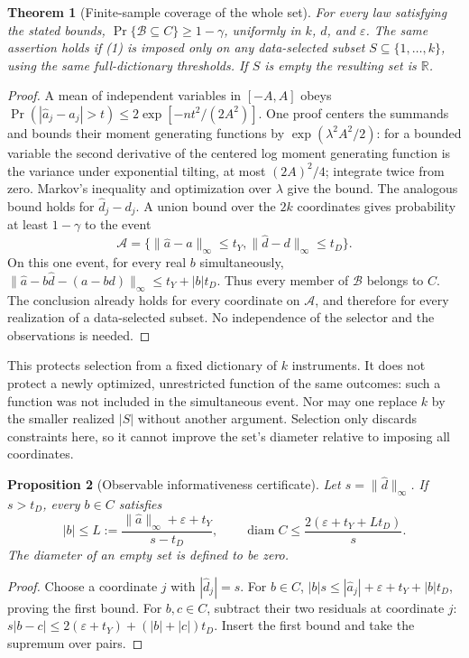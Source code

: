 \documentclass[11pt]{article}
\newtheorem{theorem}{Theorem}
\newtheorem{proposition}[theorem]{Proposition}
\theoremstyle{remark}
\newcommand{\R}{\mathbb R}
\newcommand{\diam}{\operatorname{diam}}
\begin{document}
\begin{theorem}[Finite-sample coverage of the whole set]
For every law satisfying the stated bounds,
$\Pr\{\mathcal B\subseteq C\}\geq1-\gamma$, uniformly in $k$, $d$,
and $\varepsilon$. The same assertion holds if (1) is imposed only on
any data-selected subset $S\subseteq\{1,\ldots,k\}$, using the same
full-dictionary thresholds. If $S$ is empty the resulting set is $\R$.
\end{theorem}
\begin{proof}
A mean of independent variables in $[-A,A]$ obeys
$\Pr(|\widehat a_j-a_j|>t)\leq2\exp[-nt^2/(2A^2)]$.
One proof centers the summands and bounds their moment generating
functions by $\exp(\lambda^2A^2/2)$: for a bounded variable the second
derivative of the centered log moment generating function is the variance
under exponential tilting, at most $(2A)^2/4$; integrate twice from zero.
Markov's inequality and optimization over $\lambda$ give the bound.
The analogous bound holds for $\widehat d_j-d_j$. A union bound over
the $2k$ coordinates gives probability at least $1-\gamma$ to the event
\[
 \mathcal A=\{\|\widehat a-a\|_\infty\leq t_Y,
                 \|\widehat d-d\|_\infty\leq t_D\}.
\]
On this one event, for every real $b$ simultaneously,
$\|\widehat a-b\widehat d-(a-bd)\|_\infty\leq t_Y+|b|t_D$.
Thus every member of $\mathcal B$ belongs to $C$. The conclusion already
holds for every coordinate on $\mathcal A$, and therefore for every
realization of a data-selected subset. No independence of the selector
and the observations is needed.
\end{proof}

This protects selection from a fixed dictionary of $k$ instruments.
It does not protect a newly optimized, unrestricted function of the same
outcomes: such a function was not included in the simultaneous event.
Nor may one replace $k$ by the smaller realized $|S|$ without another
argument. Selection only discards constraints here, so it cannot improve
the set's diameter relative to imposing all coordinates.

\begin{proposition}[Observable informativeness certificate]
Let $s=\|\widehat d\|_\infty$. If $s>t_D$, every $b\in C$ satisfies
\[
 |b|\leq L:=\frac{\|\widehat a\|_\infty+\varepsilon+t_Y}{s-t_D},
 \qquad
 \diam C\leq\frac{2(\varepsilon+t_Y+Lt_D)}s. \tag{2}
\]
The diameter of an empty set is defined to be zero.
\end{proposition}
\begin{proof}
Choose a coordinate $j$ with $|\widehat d_j|=s$. For $b\in C$,
$|b|s\leq|\widehat a_j|+\varepsilon+t_Y+|b|t_D$, proving the first
bound. For $b,c\in C$, subtract their two residuals at coordinate $j$:
$s|b-c|\leq2(\varepsilon+t_Y)+(|b|+|c|)t_D$.
Insert the first bound and take the supremum over pairs.
\end{proof}
\end{document}
